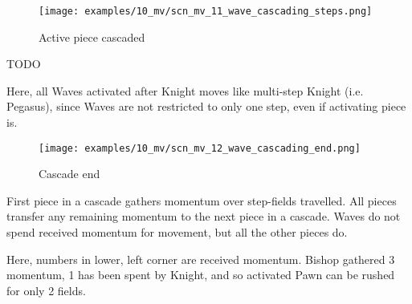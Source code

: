 \vspace*{-2.1\baselineskip}
\noindent
\begin{figure}[h]
\texttt{[image: examples/10\_mv/scn\_mv\_11\_wave\_cascading\_steps.png]}
\caption{Active piece cascaded}
\label{fig:scn_mv_11_wave_cascading_steps}
\end{figure}

\huge
TODO
\normalsize


Here, all Waves activated after Knight moves like multi-step Knight (i.e. Pegasus),
since Waves are not restricted to only one step, even if activating piece is.

\clearpage %

\vspace*{-2.1\baselineskip}
\noindent
\begin{figure}[h]
\texttt{[image: examples/10\_mv/scn\_mv\_12\_wave\_cascading\_end.png]}
\caption{Cascade end}
\label{fig:scn_mv_12_wave_cascading_end}
\end{figure}

First piece in a cascade gathers momentum over step-fields travelled. All pieces
transfer any remaining momentum to the next piece in a cascade. Waves do not spend
received momentum for movement, but all the other pieces do.

Here, numbers in lower, left corner are received momentum. Bishop gathered 3 momentum,
1 has been spent by Knight, and so activated Pawn can be rushed for only 2 fields.




